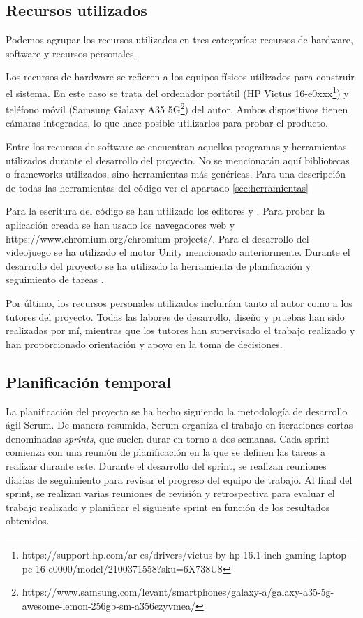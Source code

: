 \subsection{Recursos utilizados}
Podemos agrupar los recursos utilizados en tres categorías: recursos de hardware, software y
recursos personales.

Los recursos de hardware se refieren a los equipos físicos utilizados para
construir el sistema. En este caso se trata del ordenador portátil (HP Victus
16-e0xxx\footnote{https://support.hp.com/ar-es/drivers/victus-by-hp-16.1-inch-gaming-laptop-pc-16-e0000/model/2100371558?sku=6X738U8})
y teléfono móvil (Samsung Galaxy A35
5G\footnote{https://www.samsung.com/levant/smartphones/galaxy-a/galaxy-a35-5g-awesome-lemon-256gb-sm-a356ezyvmea/})
del autor. Ambos dispositivos tienen cámaras integradas, lo que hace posible
utilizarlos para probar el producto.

Entre los recursos de software se encuentran aquellos programas y herramientas utilizados durante el
desarrollo del proyecto. No se mencionarán aquí bibliotecas o \glspl{framework} utilizados, sino herramientas
más genéricas. Para una descripción de todas las herramientas del código ver el apartado \ref{sec:herramientas}

Para la escritura del código se han utilizado los editores 
y . Para probar la aplicación creada se han usado los navegadores web
 y 
{https://www.chromium.org/chromium-projects/}. Para el desarrollo del videojuego se ha utilizado el motor
Unity mencionado anteriormente. Durante el desarrollo del proyecto se ha utilizado la herramienta de
planificación y seguimiento de tareas .

Por último, los recursos personales utilizados incluirían tanto al autor como a
los tutores del proyecto. Todas las labores de desarrollo, diseño y pruebas han
sido realizadas por mí, mientras que los tutores han supervisado el trabajo
realizado y han proporcionado orientación y apoyo en la toma de decisiones.

\subsection{Planificación temporal}
La planificación del proyecto se ha hecho siguiendo la metodología de desarrollo ágil Scrum. De manera
resumida, Scrum organiza el trabajo en iteraciones cortas denominadas \textit{sprints}, que suelen durar
en torno a dos semanas. Cada sprint comienza con una reunión de planificación en la que se definen las
tareas a realizar durante este. Durante el desarrollo del sprint, se realizan reuniones diarias de
seguimiento para revisar el progreso del equipo de trabajo. Al final del sprint, se realizan varias
reuniones de revisión y retrospectiva para evaluar el trabajo realizado y planificar el siguiente sprint
en función de los resultados obtenidos.

